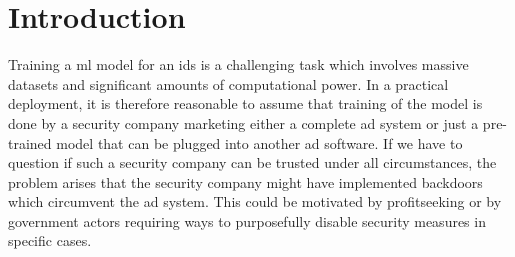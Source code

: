 \documentclass[9pt,sigconf,letterpaper,dvipsnames\ifx\removeHeaders\tempYes ,nonacm\fi]{acmart}
\begin{document}
\author{Maximilian Bachl, Alexander Hartl, Joachim Fabini, Tanja Zseby}



\ifx\removeHeaders\tempYes
{}
\fi
\maketitle

\section{Introduction}

Training a \gls{ml} model for an \gls{ids} is a challenging task which involves massive datasets and significant amounts of computational power. In a practical deployment, it is therefore reasonable to assume that training of the model is done by a security company marketing either a complete \gls{ad} system or just a pre-trained model that can be plugged into another \gls{ad} software. %
If we have to question if such a security company can be trusted under all circumstances, the problem arises that the security company might have implemented backdoors which circumvent the \gls{ad} system. This could be motivated by profitseeking or by government actors requiring ways to purposefully disable security measures in specific cases.
\end{document}
